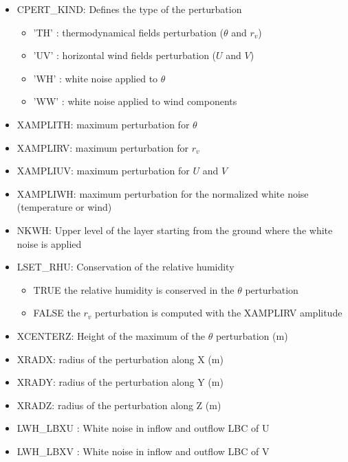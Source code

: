 \begin{itemize}

\item CPERT\_KIND: Defines the type of the perturbation
\begin{itemize}
\item 'TH' : thermodynamical fields perturbation ($\theta$ and $r_v$)
\item 'UV' : horizontal wind fields perturbation ($U$ and $V$)
\item 'WH' :  white noise applied to $\theta$
\item 'WW' :  white noise applied to wind components
\end{itemize}

\item XAMPLITH: maximum perturbation for $\theta$

\item XAMPLIRV: maximum perturbation  for $r_v$

\item XAMPLIUV: maximum perturbation for $U$ and $V$

\item XAMPLIWH: maximum perturbation for the normalized white noise (temperature or wind)

\item NKWH: Upper level of the layer starting from the ground where the white noise is applied

\item LSET\_RHU: Conservation of the relative humidity
\begin{itemize}
\item TRUE the relative humidity is conserved in the $\theta$ perturbation
\item FALSE the $r_v$ perturbation is computed with the XAMPLIRV amplitude
\end{itemize}

\item XCENTERZ: Height of the maximum of the $\theta$ perturbation (m)

\item XRADX: radius of the perturbation along X (m)

\item XRADY: radius of the perturbation along Y (m)

\item XRADZ: radius of the perturbation along Z (m)

\item LWH\_LBXU : White noise in inflow and outflow LBC of U

\item LWH\_LBXV : White noise in inflow and outflow LBC of V	

\end{itemize}


